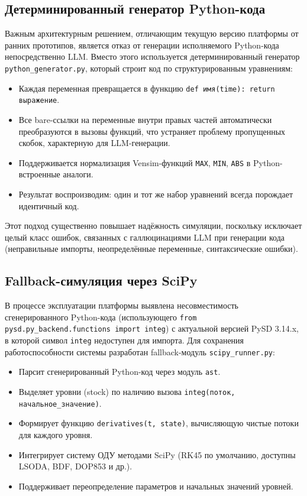 \subsection{Детерминированный генератор Python-кода}

Важным архитектурным решением, отличающим текущую версию платформы от ранних прототипов, является отказ от генерации исполняемого Python-кода непосредственно LLM. Вместо этого используется детерминированный генератор \texttt{python\_generator.py}, который строит код по структурированным уравнениям:

\begin{itemize}
    \item Каждая переменная превращается в функцию \texttt{def имя(time): return выражение}.
    \item Все bare-ссылки на переменные внутри правых частей автоматически преобразуются в вызовы функций, что устраняет проблему пропущенных скобок, характерную для LLM-генерации.
    \item Поддерживается нормализация Vensim-функций \texttt{MAX}, \texttt{MIN}, \texttt{ABS} в Python-встроенные аналоги.
    \item Результат воспроизводим: один и тот же набор уравнений всегда порождает идентичный код.
\end{itemize}

Этот подход существенно повышает надёжность симуляции, поскольку исключает целый класс ошибок, связанных с галлюцинациями LLM при генерации кода (неправильные импорты, неопределённые переменные, синтаксические ошибки).


\subsection{Fallback-симуляция через SciPy}

В процессе эксплуатации платформы выявлена несовместимость сгенерированного Python-кода (использующего \texttt{from pysd.py\_backend.functions import integ}) с актуальной версией PySD 3.14.x, в которой символ \texttt{integ} недоступен для импорта. Для сохранения работоспособности системы разработан fallback-модуль \texttt{scipy\_runner.py}:

\begin{itemize}
    \item Парсит сгенерированный Python-код через модуль \texttt{ast}.
    \item Выделяет уровни (stock) по наличию вызова \texttt{integ(поток, начальное\_значение)}.
    \item Формирует функцию \texttt{derivatives(t, state)}, вычисляющую чистые потоки для каждого уровня.
    \item Интегрирует систему ОДУ методами SciPy (RK45 по умолчанию, доступны LSODA, BDF, DOP853 и др.).
    \item Поддерживает переопределение параметров и начальных значений уровней.
\end{itemize}

